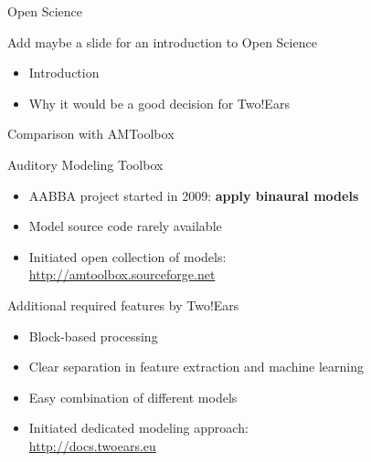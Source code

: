 \documentclass{beamer}
\begin{document}
\begin{frame}{Open Science}

    Add maybe a slide for an introduction to Open Science

    \begin{itemize}
        \item Introduction
        \item Why it would be a good decision for Two!Ears
    \end{itemize}

\end{frame}

\begin{frame}{Comparison with AMToolbox}

    \vspace{0.3cm}

    Auditory Modeling Toolbox
    \vspace{0.1cm}
    \begin{itemize}
        \item AABBA project started in 2009: \textbf{apply binaural models}
        \item Model source code rarely available
        \item Initiated open collection of models: \\
            {\small\url{http://amtoolbox.sourceforge.net}}
    \end{itemize}

    \vspace{0.6cm}

    Additional required features by Two!Ears
    \vspace{0.1cm}
    \begin{itemize}
        \item Block-based processing
        \item Clear separation in feature extraction and machine learning
        \item Easy combination of different models
        \item Initiated dedicated modeling approach: \\
            {\small\url{http://docs.twoears.eu}}
    \end{itemize}

\end{frame}
\end{document}
